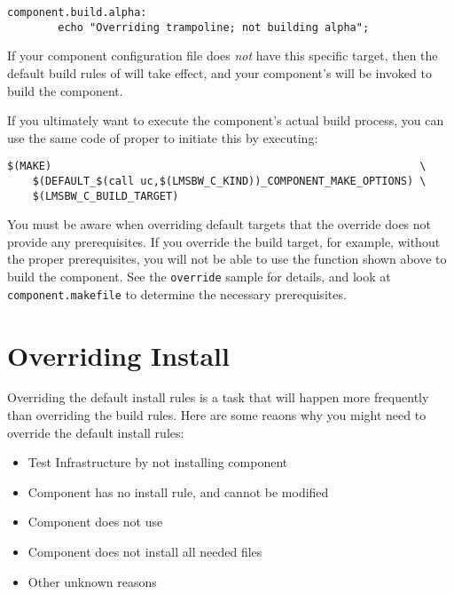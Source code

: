 \begin{verbatim}
component.build.alpha:
        echo "Overriding trampoline; not building alpha";
\end{verbatim}

If your component configuration file does \emph{not} have this
specific target, then the default build rules of \lmsbw will take
effect, and your component's \makefile will be invoked to build the
component.

If you ultimately want to execute the component's actual build
process, you can use the same code of \lmsbw proper to initiate this
by executing:

\begin{footnotesize}
\begin{verbatim}
$(MAKE)                                                          \
    $(DEFAULT_$(call uc,$(LMSBW_C_KIND))_COMPONENT_MAKE_OPTIONS) \
    $(LMSBW_C_BUILD_TARGET)
\end{verbatim}
\end{footnotesize}

You must be aware when overriding default targets that the override
does not provide any prerequisites.  If you override the build target,
for example, without the proper prerequisites, you will not be able to
use the function shown above to build the component.  See the
\texttt{override} sample for details, and look at
\texttt{component.makefile} to determine the necessary prerequisites.

\section{Overriding Install}\label{overriding:overriding-install}

Overriding the default install rules is a task that will happen more
frequently than overriding the build rules.  Here are some reaons why
you might need to override the default install rules:

\begin{itemize}
\item Test \bni Infrastructure by not installing component
\item Component \makefile has no install rule, and cannot be modified
\item Component \makefile does not use \destdir
\item Component does not install all needed files
\item Other unknown reasons
\end{itemize}


